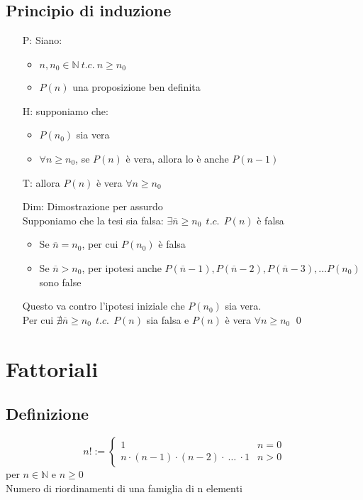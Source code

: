 \documentclass[a4paper]{article}
\begin{document}
\subsection{Principio di induzione}
\begin{itemize}
	\item[P:] Siano:
	\begin{itemize}
		\item \(n, n_0 \in \mathbb{N} \  t.c. \  n \geq n_0\)
		\item \(P(n)\) una proposizione ben definita
	\end{itemize}
	\item[H:] supponiamo che:
	\begin{itemize}
		\item \(P(n_0)\) sia vera
		\item \(\forall n \geq n_0\), se \(P(n)\) è vera, allora lo è anche \(P(n-1)\)
	\end{itemize}
	\item[T:] allora \(P(n)\) è vera \(\forall n \geq n_0\)
	\item[Dim:] Dimostrazione per assurdo \\
	Supponiamo che la tesi sia falsa: \(\exists \overline{n} \geq n_0 \ \  t.c. \ \  P(n)\) è falsa
	\begin{itemize}
		\item Se \(\overline{n} = n_0\), per cui \(P(n_0)\) è falsa
		\item Se \(\overline{n} > n_0\), per ipotesi anche \(P(\overline{n} - 1), P(\overline{n} - 2), P(\overline{n} - 3), \dots P(n_0)\) sono false
	\end{itemize}
	Questo va contro l'ipotesi iniziale che \(P(n_0)\) sia vera. \\
	Per cui \(\nexists \overline{n} \geq n_0 \ \  t.c. \ \  P(n)\) sia falsa e \(P(n)\) è vera \(\forall n \geq n_0\) \qed
\end{itemize}

\newpage

\section{Fattoriali}
\subsection{Definizione}
\begin{equation*}
	n! :=
	\begin{cases}
		1 & n = 0 \\
		n \cdot (n-1) \cdot (n-2) \cdot \  \dots \  \cdot 1 & n > 0 
	\end{cases}
\end{equation*}
per \(n \in \mathbb{N}\) e \(n \geq 0\) \\
Numero di riordinamenti di una famiglia di n elementi
\end{document}
